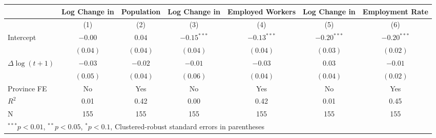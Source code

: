 
\begin{tabular}{l |c c| c c| c c }
\hline
 & Log Change in & Population & Log Change in & Employed Workers & Log Change in & Employment Rate \\
 \hline
  & (1) & (2) & (3) & (4) & (5) & (6) \\
\hline
Intercept & $-0.00$  & $0.04$   & $-0.15^{***}$ & $-0.13^{***}$ & $-0.20^{***}$ & $-0.20^{***}$ \\
            & $(0.04)$ & $(0.04)$ & $(0.04)$      & $(0.04)$      & $(0.03)$      & $(0.02)$      \\
$\Delta \log(t+1)$     & $-0.03$  & $-0.02$  & $-0.01$       & $-0.03$       & $0.03$        & $-0.01$       \\
            & $(0.05)$ & $(0.04)$ & $(0.06)$      & $(0.04)$      & $(0.04)$      & $(0.02)$      \\
\hline
Province FE     &No&Yes&No&Yes&No&Yes\\ 
\hline
$R^2$       & 0.01     & 0.42     & 0.00          & 0.42          & 0.01          & 0.45          \\
N           & 155      & 155      & 155           & 155           & 155           & 155           \\
\hline
\multicolumn{7}{l}{\scriptsize{$^{***}p<0.01$, $^{**}p<0.05$, $^*p<0.1$, Clustered-robust standard errors in parentheses}}
\end{tabular}
